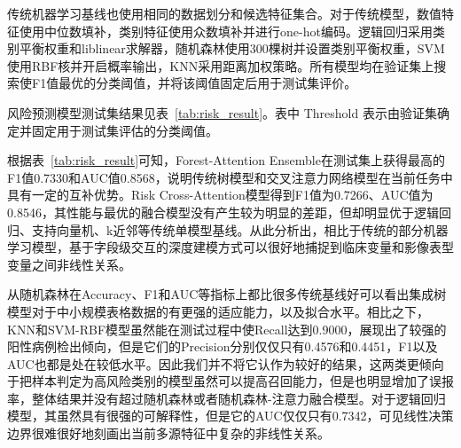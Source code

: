 传统机器学习基线也使用相同的数据划分和候选特征集合。对于传统模型，数值特征使用中位数填补，类别特征使用众数填补并进行one-hot编码。逻辑回归采用类别平衡权重和liblinear求解器，随机森林使用300棵树并设置类别平衡权重，SVM使用RBF核并开启概率输出，KNN采用距离加权策略。所有模型均在验证集上搜索使F1值最优的分类阈值，并将该阈值固定后用于测试集评价。

风险预测模型测试集结果见表~\ref{tab:risk_result}。表中 Threshold 表示由验证集确定并固定用于测试集评估的分类阈值。

\begin{table}[!htbp]
\centering
\caption{风险预测模型测试集对比结果}
\label{tab:risk_result}
\small
\renewcommand{\arraystretch}{0.88}
\setlength{\tabcolsep}{3pt}
\normalsize
\renewcommand{\arraystretch}{1}
\end{table}

根据表~\ref{tab:risk_result}可知，Forest-Attention Ensemble在测试集上获得最高的F1值0.7330和AUC值0.8568，说明传统树模型和交叉注意力网络模型在当前任务中具有一定的互补优势。Risk Cross-Attention模型得到F1值为0.7266、AUC值为0.8546，其性能与最优的融合模型没有产生较为明显的差距，但却明显优于逻辑回归、支持向量机、k近邻等传统单模型基线。从此分析出，相比于传统的部分机器学习模型，基于字段级交互的深度建模方式可以很好地捕捉到临床变量和影像表型变量之间非线性关系。

从随机森林在Accuracy、F1和AUC等指标上都比很多传统基线好可以看出集成树模型对于中小规模表格数据的有更强的适应能力，以及拟合水平。相比之下，KNN和SVM-RBF模型虽然能在测试过程中使Recall达到0.9000，展现出了较强的阳性病例检出倾向，但是它们的Precision分别仅仅只有0.4576和0.4451，F1以及AUC也都是处在较低水平。因此我们并不将它认作为较好的结果，这两类更倾向于把样本判定为高风险类别的模型虽然可以提高召回能力，但是也明显增加了误报率，整体结果并没有超过随机森林或者随机森林-注意力融合模型。对于逻辑回归模型，其虽然具有很强的可解释性，但是它的AUC仅仅只有0.7342，可见线性决策边界很难很好地刻画出当前多源特征中复杂的非线性关系。

